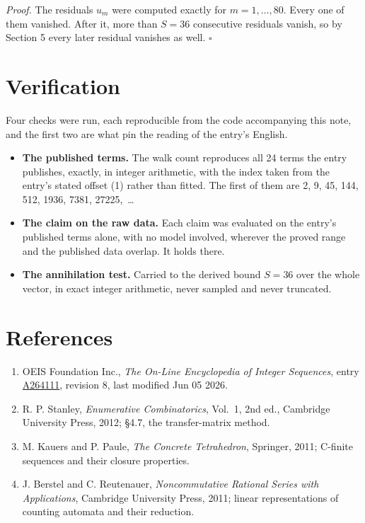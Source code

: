 \documentclass[11pt]{article}
\theoremstyle{definition}
\begin{document}
{\itshape Proof.} The residuals $u_m$ were computed exactly for $m = 1,\dots,80$. Every one of them vanished. After it, more than $S = 36$ consecutive residuals vanish, so by Section 5 every later residual vanishes as well. $\square$

\section{Verification}

Four checks were run, each reproducible from the code accompanying this note, and the first two are what pin the reading of the entry's English.

\begin{itemize}

\item {\bfseries The published terms.} The walk count reproduces all 24 terms the entry publishes, exactly, in integer arithmetic, with the index taken from the entry's stated offset (1) rather than fitted. The first of them are 2, 9, 45, 144, 512, 1936, 7381, 27225,~\dots

\item {\bfseries The claim on the raw data.} Each claim was evaluated on the entry's published terms alone, with no model involved, wherever the proved range and the published data overlap. It holds there.

\item {\bfseries The annihilation test.} Carried to the derived bound $S = 36$ over the whole vector, in exact integer arithmetic, never sampled and never truncated.

\end{itemize}

\section{References}

\begin{enumerate}

\item OEIS Foundation Inc., \emph{The On-Line Encyclopedia of Integer Sequences}, entry \href{https://oeis.org/A264111}{A264111}, revision 8, last modified Jun 05 2026.

\item R. P. Stanley, \emph{Enumerative Combinatorics}, Vol.~1, 2nd ed., Cambridge University Press, 2012; \S4.7, the transfer-matrix method.

\item M. Kauers and P. Paule, \emph{The Concrete Tetrahedron}, Springer, 2011; C-finite sequences and their closure properties.

\item J. Berstel and C. Reutenauer, \emph{Noncommutative Rational Series with Applications}, Cambridge University Press, 2011; linear representations of counting automata and their reduction.

\end{enumerate}
\end{document}
